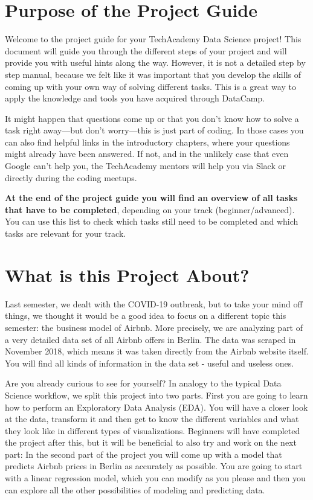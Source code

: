 \documentclass[
  11pt,
]{book}
\begin{document}
\hypertarget{purpose-of-the-project-guide}{%
\section{Purpose of the Project
Guide}\label{purpose-of-the-project-guide}}

Welcome to the project guide for your TechAcademy Data Science project!
This document will guide you through the different steps of your project
and will provide you with useful hints along the way. However, it is not
a detailed step by step manual, because we felt like it was important
that you develop the skills of coming up with your own way of solving
different tasks. This is a great way to apply the knowledge and tools
you have acquired through DataCamp.

It might happen that questions come up or that you don't know how to
solve a task right away---but don't worry---this is just part of coding.
In those cases you can also find helpful links in the introductory
chapters, where your questions might already have been answered. If not,
and in the unlikely case that even Google can't help you, the
TechAcademy mentors will help you via Slack or directly during the
coding meetups.

\textbf{At the end of the project guide you will find an overview of all
tasks that have to be completed}, depending on your track
(beginner/advanced). You can use this list to check which tasks still
need to be completed and which tasks are relevant for your track.

\hypertarget{what-is-this-project-about}{%
\section{What is this Project About?}\label{what-is-this-project-about}}

Last semester, we dealt with the COVID-19 outbreak, but to take your
mind off things, we thought it would be a good idea to focus on a
different topic this semester: the business model of Airbnb. More
precisely, we are analyzing part of a very detailed data set of all
Airbnb offers in Berlin. The data was scraped in November 2018, which
means it was taken directly from the Airbnb website itself. You will
find all kinds of information in the data set - useful and useless ones.

Are you already curious to see for yourself? In analogy to the typical
Data Science workflow, we split this project into two parts. First you
are going to learn how to perform an Exploratory Data Analysis (EDA).
You will have a closer look at the data, transform it and then get to
know the different variables and what they look like in different types
of visualizations. Beginners will have completed the project after this,
but it will be beneficial to also try and work on the next part: In the
second part of the project you will come up with a model that predicts
Airbnb prices in Berlin as accurately as possible. You are going to
start with a linear regression model, which you can modify as you please
and then you can explore all the other possibilities of modeling and
predicting data.
\end{document}
